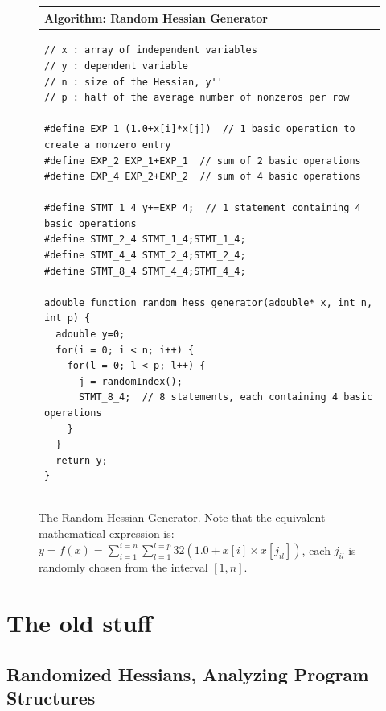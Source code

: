 \documentclass[11pt, twocolumn]{article}
\begin{document}
\begin{figure}
\begin{center}
\begin{tabular*}{\textwidth}{l}
\hline
\textbf{Algorithm:} Random Hessian Generator \\  
\hline
\begin{minipage}{3in}
\begin{verbatim}
// x : array of independent variables
// y : dependent variable
// n : size of the Hessian, y''
// p : half of the average number of nonzeros per row

#define EXP_1 (1.0+x[i]*x[j])  // 1 basic operation to create a nonzero entry
#define EXP_2 EXP_1+EXP_1  // sum of 2 basic operations
#define EXP_4 EXP_2+EXP_2  // sum of 4 basic operations

#define STMT_1_4 y+=EXP_4;  // 1 statement containing 4 basic operations
#define STMT_2_4 STMT_1_4;STMT_1_4;
#define STMT_4_4 STMT_2_4;STMT_2_4;
#define STMT_8_4 STMT_4_4;STMT_4_4;

adouble function random_hess_generator(adouble* x, int n, int p) {
  adouble y=0;
  for(i = 0; i < n; i++) {
    for(l = 0; l < p; l++) {
      j = randomIndex();
      STMT_8_4;  // 8 statements, each containing 4 basic operations
    }
  }
  return y;
}
\end{verbatim}
\end{minipage} \\
\hline
\end{tabular*}
\end{center}
\caption[The Random Hessian Generator]{The Random Hessian Generator. Note that the equivalent mathematical expression is: $y=f(x)=\sum_{i=1}^{i=n} \sum_{l=1}^{l=p} 32 (1.0 + x[i] \times x[j_{il}])$, each $j_{il}$ is randomly chosen from the interval $[1, n]$.}
\label{fig:RandomHessianGenerator}
\end{figure}

\newpage

\section{The old stuff}
\subsection{Randomized Hessians, Analyzing Program Structures}
\label{sec-perf-rand}

\label{sec-perf-random}
\end{document}
